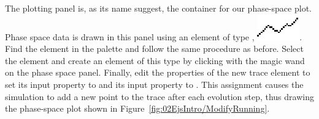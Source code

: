 The plotting panel is, as its name suggest, the container for our phase-space plot. Phase space data is drawn in this panel using an element of type , \includegraphics[scale=\linescale]{images/Elements/Trace.eps}.  Find the  element in the  palette and follow the same procedure as before.  Select the  element and create an element of this type by clicking with the magic wand on the phase space panel. Finally, edit the properties of the new trace element to set its  input property to  and its  input property to . This assignment causes the simulation to add a new  point to the trace after each evolution step, thus drawing the phase-space plot shown in Figure~\ref{fig:02EjsIntro/ModifyRunning}.
